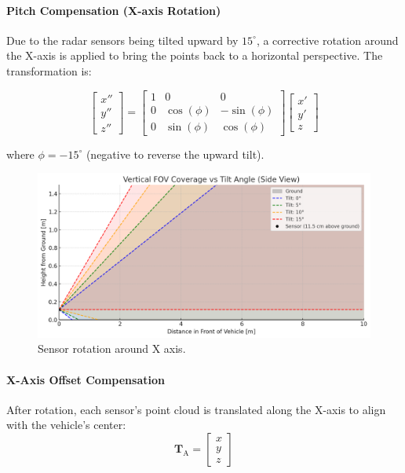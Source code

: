 \vspace{2em}

\paragraph{Pitch Compensation (X-axis Rotation)}
Due to the radar sensors being tilted upward by $15^\circ$, a corrective rotation around the X-axis is applied to bring the points back to a horizontal perspective. 
The transformation is:

\[
\begin{bmatrix}
x'' \\
y'' \\
z''
\end{bmatrix}
=
\begin{bmatrix}
1&0&0\\
0& \cos(\phi) & -\sin(\phi) \\
0& \sin(\phi) & \cos(\phi)
\end{bmatrix}
\begin{bmatrix}
x' \\
y' \\
z
\end{bmatrix}
\]

where $\phi = -15^\circ$ (negative to reverse the upward tilt).

\begin{figure}[!htbp]
    \centering
    \includegraphics[width=1.0\linewidth]{images/TiltSensor.png}
    \caption{Sensor rotation around X axis.}
    \label{fig: X axis rotation}
\end{figure}

\paragraph{X-Axis Offset Compensation}
After rotation, each sensor's point cloud is translated along the X-axis to align with the vehicle's center:
\[
\mathbf{T}_{\text{A}} = 
\begin{bmatrix}
x \\
y \\
z
\end{bmatrix}
\]

